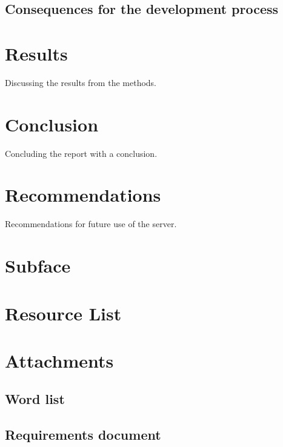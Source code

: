 \documentclass[paper=a4, fontsize=11pt,twoside]{scrartcl}	%
\begin{document}
\subsection{Consequences for the development process}


\newpage
\section{Results}
Discussing the results from the methods.
\newpage
\section{Conclusion}
Concluding the report with a conclusion.
\newpage
\section{Recommendations}
Recommendations for future use of the server.
\newpage

\section{Subface}
\newpage

\section{Resource List}


\newpage

\section{Attachments}
\subsection{Word list}

\subsection{Requirements document}




\end{document}
